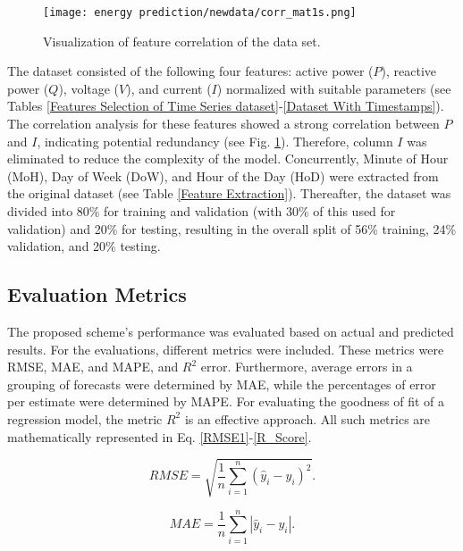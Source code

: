 \documentclass[journal]{IEEEtran}
\begin{document}
 
\begin{figure}[!h]
    \centering
    \texttt{[image: energy prediction/newdata/corr\_mat1s.png]}
        \caption{Visualization of feature correlation of the data set.}
    \label{Features correlation }
\end{figure}
The dataset consisted of the following four features: active power ($P$), reactive power ($Q$), voltage ($V$), and current ($I$) normalized with suitable parameters (see Tables \ref{Features Selection of Time Series dataset}-\ref{Dataset With Timestamps}). The correlation analysis for these features showed a strong correlation between $P$ and $I$, indicating potential redundancy (see Fig. \ref{Features correlation }). Therefore, column $I$ was eliminated to reduce the complexity of the model. Concurrently, Minute of Hour (MoH), Day of Week (DoW), and Hour of the Day (HoD) were extracted from the original dataset (see Table \ref{Feature Extraction}). Thereafter, the dataset was divided into 80\% for training and validation (with 30\% of this used for validation) and  20\% for testing, resulting in the overall split of 56\% training, 24\% validation, and 20\% testing. 








\subsection{Evaluation Metrics}
The proposed scheme's performance was evaluated based on actual and predicted results. For the evaluations, different metrics were included. These metrics were RMSE, MAE, and MAPE, and $R^2$ error. Furthermore, average errors in a grouping of forecasts were determined by MAE, while the percentages of error per estimate were determined by MAPE. For evaluating the goodness of fit of a regression model, the metric $R^2$ is an effective approach. All such metrics are mathematically represented in Eq. \eqref{RMSE1}-\eqref{R_Score}.






 



\begin{equation}
RMSE = \sqrt{\frac{1}{n} \sum_{i=1}^{n} (\hat{y}_i - y_i)^2}.
\label{RMSE1}
\end{equation}


\begin{equation}
    MAE = \frac{1}{n} \sum_{i=1}^{n} \left| \hat{y}_i - y_i \right|.
    \label{MAE1}
\end{equation}
\end{document}

